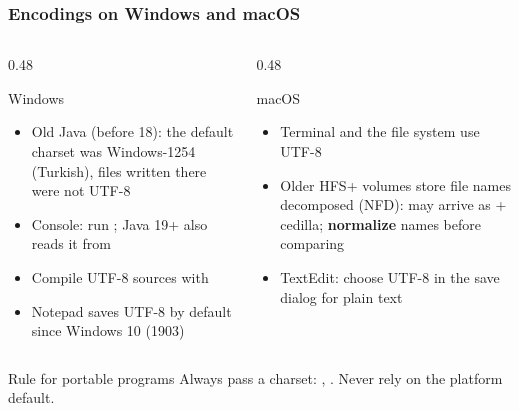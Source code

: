 \documentclass[aspectratio=169,10pt,compress]{beamer}
\begin{document}
\begin{frame}[t,fragile] \frametitle{Encodings on Windows and macOS}
  \begin{columns}[T]
    \begin{column}{0.48\textwidth}
      \begin{block}{Windows}
        \footnotesize
        
        \begin{itemize}
          
          \item Old Java (before 18): the default charset was Windows-1254 (Turkish), 
          files written there were not UTF-8
          
          \item Console: run ; 
          Java 19+ also reads it from 
          
          \item Compile UTF-8 sources with 
          
          \item Notepad saves UTF-8 by default since Windows 10 (1903)
        \end{itemize}
        
      \end{block}
    \end{column}
    \begin{column}{0.48\textwidth}
      \begin{block}{macOS}
        \footnotesize
        
        \begin{itemize}
          
          \item Terminal and the file system use UTF-8
          
          \item Older HFS+ volumes store file names decomposed (NFD): 
           may arrive as  + cedilla;
          \textbf{normalize} names before comparing
          
          \item TextEdit: choose UTF-8 in the save dialog for plain text
        \end{itemize}
        
      \end{block}
    \end{column}
  \end{columns}
  
  \vspace{0.3em}
  
  \begin{alertblock}{Rule for portable programs}
    \small Always pass a charset: 
    ,
    . 
    Never rely on the platform default.
  \end{alertblock}
\end{frame}
\end{document}
